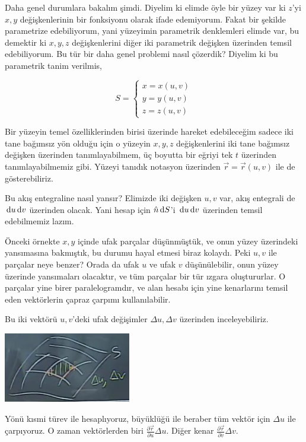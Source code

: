 \documentclass[12pt,fleqn]{article}\usepackage{../../common}
\begin{document}
Daha genel durumlara bakalım şimdi. Diyelim ki elimde öyle bir yüzey var ki
$z$'yi $x,y$ değişkenlerinin bir fonksiyonu olarak ifade edemiyorum. Fakat
bir şekilde parametrize edebiliyorum, yani yüzeyimin parametrik denklemleri
elimde var, bu demektir ki $x,y,z$ değişkenlerini diğer iki parametrik değişken
üzerinden temsil edebiliyorum. Bu tür bir daha genel problemi nasıl çözerdik?
Diyelim ki bu parametrik tanim verilmis,

$$
S = \left\{ \begin{array}{l}
x = x(u,v) \\ y = y(u,v) \\ z = z(u,v)
\end{array} \right.
$$

Bir yüzeyin temel özelliklerinden birisi üzerinde hareket edebileceğim sadece
iki tane bağımsız yön olduğu için o yüzeyin $x,y,z$ değişkenlerini iki tane
bağımsız değişken üzerinden tanımlayabilmem, üç boyutta bir eğriyi tek $t$
üzerinden tanımlayabilmemiz gibi. Yüzeyi tanıdık notasyon üzerinden
$\vec{r} = \vec{r}(u,v)$ ile de gösterebiliriz.

Bu akış entegraline nasıl yansır? Elimizde iki değişken $u,v$ var, akış
entegrali de $\,\mathrm{d} u \,\mathrm{d} v$ üzerinden olacak. Yani hesap için $\hat{n} \,\mathrm{d} S$'i
$\,\mathrm{d} u \,\mathrm{d} v$ üzerinden temsil edebilmemiz lazım. 

Önceki örnekte $x,y$ içinde ufak parçalar düşünmüştük, ve onun yüzey üzerindeki
yansımasına bakmıştık, bu durumu hayal etmesi biraz kolaydı. Peki $u,v$ ile
parçalar neye benzer? Orada da ufak $u$ ve ufak $v$ düşünülebilir, onun yüzey
üzerinde yansımaları olacaktır, ve tüm parçalar bir tür ızgara oluştururlar.  O
parçalar yine birer paralelogramdır, ve alan hesabı için yine kenarlarını temsil
eden vektörlerin çapraz çarpımı kullanılabilir.

Bu iki vektörü $u,v$'deki ufak değişimler $\Delta u, \Delta v$ üzerinden
inceleyebiliriz.

\includegraphics[width=15em]{calc_multi_28_05.png}

Yönü kısmi türev ile hesaplıyoruz, büyüklüğü ile beraber tüm vektör için $\Delta u$
ile çarpıyoruz. O zaman vektörlerden biri $\frac{\partial \vec{r}}{\partial u} \Delta u$.
Diğer kenar $\frac{\partial \vec{r}}{\partial v} \Delta v$. 
\end{document}
